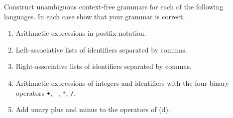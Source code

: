 \begin{exercise}
    Construct unambiguous context-free grammars for each of the following 
    languages. In each case show that your grammar is correct.
    \begin{enumerate}[label=\alph*)]
        \item Arithmetic expressions in postfix notation.
        \item Left-associative lists of identifiers separated by commas.
        \item Right-associative lists of identifiers separated by commas.
        \item Arithmetic expressions of integers and identifiers with the four binary
        operators \texttt{+}, \texttt{-}, \texttt{*}, \texttt{/}.
        \item Add unary plus and minus to the operators of (d).
    \end{enumerate}
\end{exercise}
